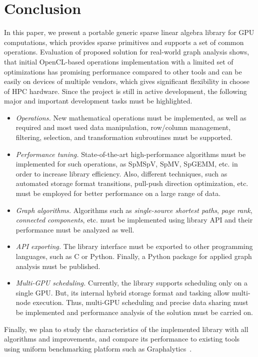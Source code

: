 \section{Conclusion}

In this paper, we present a portable generic sparse linear algebra library for GPU computations, which provides sparse primitives and supports a set of common operations. Evaluation of proposed solution for real-world graph analysis shows, that initial OpenCL-based operations implementation with a limited set of optimizations has promising performance compared to other tools and can be easily on devices of multiple vendors, which gives significant flexibility in choose of HPC hardware. Since the project is still in active development, the following major and important development tasks must be highlighted.

\begin{itemize}
    \item \textit{Operations.} New mathematical operations must be implemented, as well as required and most used data manipulation, row/column management, filtering, selection, and transformation subroutines must be supported.
    
    \item \textit{Performance tuning.} State-of-the-art high-performance algorithms must be implemented for such operations, as SpMSpV, SpMV, SpGEMM, etc. in order to increase library efficiency. Also, different techniques, such as automated storage format transitions, pull-push direction optimization, etc. must be employed for better performance on a large range of data.
    
    \item \textit{Graph algorithms.} Algorithms such as \textit{single-source shortest paths}, \textit{page rank}, \textit{connected components}, etc. must be implemented using library API and their performance must be analyzed as well. 
    
    \item \textit{API exporting.} The library interface must be exported to other programming languages, such as C or Python. Finally, a Python package for applied graph analysis must be published.
    
    \item \textit{Multi-GPU scheduling.} Currently, the library supports scheduling only on a single GPU. But, its internal hybrid storage format and tasking allow multi-node execution. Thus, multi-GPU scheduling and precise data sharing must be implemented and performance analysis of the solution must be carried on.
\end{itemize}

Finally, we plan to study the characteristics of the implemented library with all algorithms and improvements, and compare its performance to existing tools using uniform benchmarking platform such as Graphalytics~\cite{Graphalytics:iosup2021ldbc}.